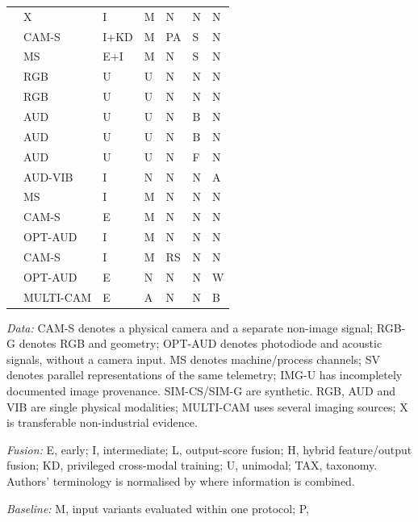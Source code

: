 \begin{longtable}{@{}p{}llllll@{}}
\parencite{Wang2020What} & X & I & M & N & N & N \\
\parencite{Xie2025Audiovisual} & CAM-S & I+KD & M & PA & S & N \\
\parencite{Goodarzi2023Deep} & MS & E+I & M & N & S & N \\
\parencite{Roth2022Towards} & RGB & U & U & N & N & N \\
\parencite{Bergmann2019MVTec} & RGB & U & U & N & N & N \\
\parencite{Purohit2019MIMII} & AUD & U & U & N & B & N \\
\parencite{Koizumi2019ToyADMOS} & AUD & U & U & N & B & N \\
\parencite{Koizumi2020Description} & AUD & U & U & N & F & N \\
\parencite{Chu2024A} & AUD-VIB & I & N & N & N & A \\
\parencite{Kullu2022A} & MS & I & M & N & N & N \\
\parencite{Chen2023Multisensor} & CAM-S & E & M & N & N & N \\
\parencite{Li2022A} & OPT-AUD & I & M & N & N & N \\
\parencite{Petrich2021Multimodal} & CAM-S & I & M & RS & N & N \\
\parencite{Pandiyan2022Deep} & OPT-AUD & E & N & N & N & W \\
\parencite{Bevans2023Heterogeneous} & MULTI-CAM & E & A & N & N & B \\
\bottomrule
\end{longtable}
\noindent\textit{Data:} CAM-S denotes a physical camera and a separate non-image signal;
RGB-G denotes RGB and geometry; OPT-AUD denotes photodiode and acoustic signals, without
a camera input. MS denotes machine/process channels; SV denotes parallel representations
of the same telemetry; IMG-U has incompletely documented image provenance. SIM-CS/SIM-G
are synthetic. RGB, AUD and VIB are single physical modalities; MULTI-CAM uses several
imaging sources; X is transferable non-industrial evidence.
\par\noindent\textit{Fusion:} E, early; I, intermediate; L, output-score fusion; H,
hybrid feature/output fusion; KD, privileged cross-modal training; U, unimodal; TAX,
taxonomy. Authors' terminology is normalised by where information is combined.
\par\noindent\textit{Baseline:} M, input variants evaluated within one protocol; P,
